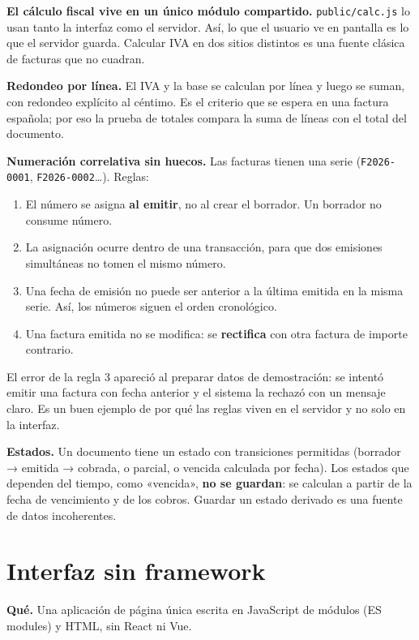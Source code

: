 \textbf{El cálculo fiscal vive en un único módulo compartido.} \texttt{public/calc.js} lo usan tanto la interfaz como el servidor. Así, lo que el usuario ve en pantalla es lo que el servidor guarda. Calcular IVA en dos sitios distintos es una fuente clásica de facturas que no cuadran.

\textbf{Redondeo por línea.} El IVA y la base se calculan por línea y luego se suman, con redondeo explícito al céntimo. Es el criterio que se espera en una factura española; por eso la prueba de totales compara la suma de líneas con el total del documento.

\textbf{Numeración correlativa sin huecos.} Las facturas tienen una serie (\texttt{F2026-0001}, \texttt{F2026-0002}\ldots). Reglas:

\begin{enumerate}
\def\labelenumi{\arabic{enumi}.}
\tightlist
\item
  El número se asigna \textbf{al emitir}, no al crear el borrador. Un borrador no consume número.
\item
  La asignación ocurre dentro de una transacción, para que dos emisiones simultáneas no tomen el mismo número.
\item
  Una fecha de emisión no puede ser anterior a la última emitida en la misma serie. Así, los números siguen el orden cronológico.
\item
  Una factura emitida no se modifica: se \textbf{rectifica} con otra factura de importe contrario.
\end{enumerate}

El error de la regla 3 apareció al preparar datos de demostración: se intentó emitir una factura con fecha anterior y el sistema la rechazó con un mensaje claro. Es un buen ejemplo de por qué las reglas viven en el servidor y no solo en la interfaz.

\textbf{Estados.} Un documento tiene un estado con transiciones permitidas (borrador → emitida → cobrada, o parcial, o vencida calculada por fecha). Los estados que dependen del tiempo, como «vencida», \textbf{no se guardan}: se calculan a partir de la fecha de vencimiento y de los cobros. Guardar un estado derivado es una fuente de datos incoherentes.

\chapter{Interfaz sin framework}\label{interfaz-sin-framework}

\textbf{Qué.} Una aplicación de página única escrita en JavaScript de módulos (ES modules) y HTML, sin React ni Vue.

